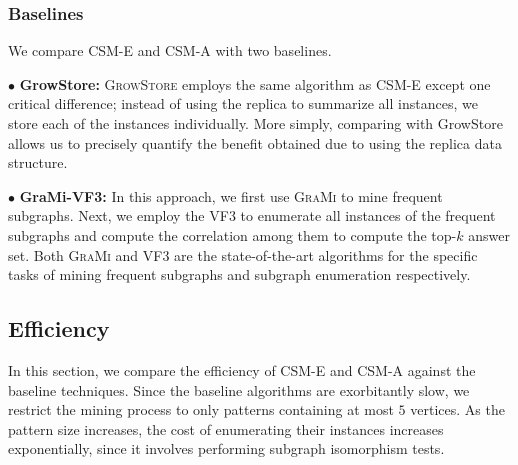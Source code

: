 \subsubsection{Baselines} We compare CSM-E and CSM-A with two baselines. %

$\bullet$ \textbf{GrowStore: } \textsc{GrowStore} employs the same algorithm as CSM-E except one critical difference; instead of using the replica to summarize all instances, we store each of the instances individually. More simply, comparing with GrowStore allows us to precisely quantify the benefit obtained due to using the replica data structure.

$\bullet$ \textbf{GraMi-VF3:} In this approach, we first use \textsc{GraMi}\cite{} to mine frequent subgraphs. Next, we employ the \textsc{VF3}\cite{} to enumerate all instances of the frequent subgraphs and compute the correlation among them to compute the top-$k$ answer set. Both \textsc{GraMi} and \textsc{VF3} are the state-of-the-art algorithms for the specific tasks of mining frequent subgraphs and subgraph enumeration respectively.

\subsection{Efficiency}
In this section, we compare the efficiency of CSM-E and CSM-A against the baseline techniques. Since the baseline algorithms are exorbitantly slow, we %
restrict the mining process to only patterns containing at most $5$ vertices. As the pattern size increases, the cost of enumerating their instances increases exponentially, since it involves performing subgraph isomorphism tests. 

